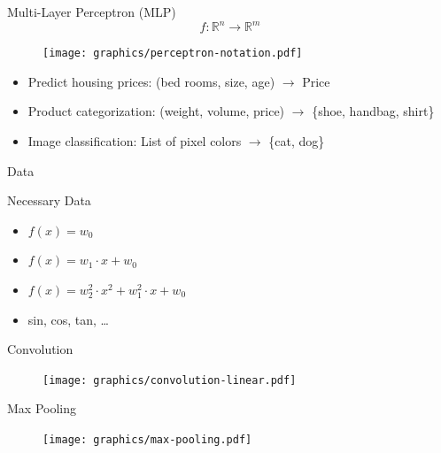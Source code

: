 \documentclass{beamer}
\begin{document}
\begin{frame}{Multi-Layer Perceptron (MLP)}
    $$f: \mathbb{R}^n \rightarrow \mathbb{R}^m$$
    \begin{figure}[ht]
        \centering
        \texttt{[image: graphics/perceptron-notation.pdf]}
    \end{figure}
\end{frame}

\begin{frame}{}
    \begin{itemize}[<+->]
        \item Predict housing prices: (bed rooms, size, age) $\rightarrow$ Price
        \item Product categorization: (weight, volume, price) $\rightarrow$ \{shoe, handbag, shirt\}
        \item Image classification: List of pixel colors $\rightarrow$ \{cat, dog\}
    \end{itemize}
\end{frame}

\begin{frame}{}
    \begin{center}
    \Huge Data
    \end{center}
\end{frame}

\begin{frame}{Necessary Data}
    \begin{itemize}
        \item $f(x) = w_0$
        \item $f(x) = w_1 \cdot x + w_0$
        \item $f(x) = w_2^2 \cdot x^2 + w_1^2 \cdot x + w_0$
        \item sin, cos, tan, \dots
    \end{itemize}
\end{frame}

\begin{frame}{Convolution}
\begin{figure}[ht]
    \centering
    \texttt{[image: graphics/convolution-linear.pdf]}
\end{figure}
\end{frame}

\begin{frame}{Max Pooling}
\begin{figure}[ht]
    \centering
    \texttt{[image: graphics/max-pooling.pdf]}
\end{figure}
\end{frame}
\end{document}
